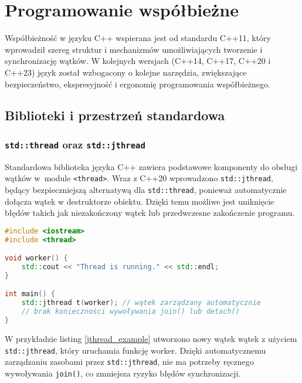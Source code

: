 \section{Programowanie współbieżne}
Współbieżność w języku C++ wspierana jest od standardu C++11, który wprowadził szereg struktur i mechanizmów umożliwiających tworzenie i synchronizację wątków. W kolejnych wersjach (C++14, C++17, C++20 i C++23) język został wzbogacony o kolejne narzędzia, zwiększające bezpieczeństwo, ekspresyjność i ergonomię programowania współbieżnego.

\subsection{Biblioteki i przestrzeń standardowa}
\subsubsection{\texttt{std::thread} oraz \texttt{std::jthread}}
Standardowa biblioteka języka C++ zawiera podstawowe komponenty do obsługi wątków w~module \texttt{<thread>}. Wraz z C++20 wprowadzono \texttt{std::jthread}, będący bezpieczniejszą alternatywą dla \texttt{std::thread}, ponieważ automatycznie dołącza wątek w destruktorze obiektu. Dzięki temu możliwe jest uniknięcie błędów takich jak niezakończony wątek   lub przedwczesne zakończenie programu.

\begin{lstlisting}[language=C++, style=VS2017,  caption={Przykład użycia std::jthread}, label={jthread_example}]
#include <iostream>
#include <thread>

void worker() {
    std::cout << "Thread is running." << std::endl;
}

int main() {
    std::jthread t(worker); // wątek zarządzany automatycznie
    // brak konieczności wywoływania join() lub detach()
}
\end{lstlisting}    
W przykładzie listing \ref{jthread_example} utworzono nowy wątek wątek z użyciem \texttt{std::jthread}, który uruchamia funkcję worker. Dzięki automatycznemu zarządzaniu zasobami przez \texttt{std::jthread}, nie ma potrzeby ręcznego wywoływania \texttt{join()}, co zmniejsza ryzyko błędów synchronizacji.


